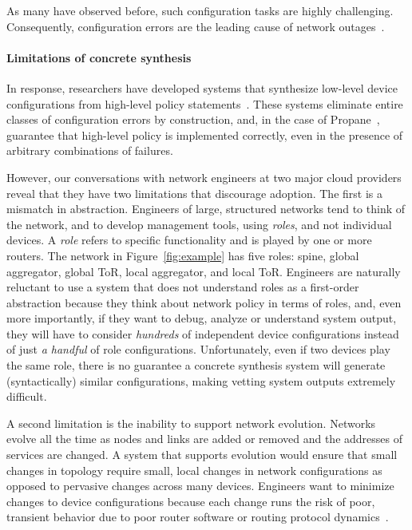 \documentclass{sig-alternate-10pt}
\begin{document}
As many have observed before, such configuration tasks are highly challenging. Consequently, configuration errors are the leading cause of network outages~\cite{juniper-study,bgpmon,batfish,propane}.

\paragraph*{Limitations of concrete synthesis}

In response, researchers have developed systems that synthesize low-level device configurations from high-level policy statements~\cite{narain:lisa05,narain+:configassure,dadc,propane}.
These systems eliminate entire classes of configuration errors by construction, and, in the case of
Propane~\cite{propane}, guarantee that high-level policy is implemented correctly, even in the presence of 
arbitrary combinations of failures.

However, our conversations with network engineers at two major cloud providers reveal that they have two limitations that discourage adoption.  The first is a mismatch in abstraction. Engineers of large, structured networks tend to think of the network, and to develop management tools, using \emph{roles}, and not individual devices. 
A {\em role} refers to specific functionality and is played by one or more routers. The network in Figure~\ref{fig:example} has five roles: spine, global aggregator, global ToR, local aggregator, and local ToR.  Engineers are naturally reluctant to use a system that does not 
understand roles as a first-order abstraction because they think about 
network policy in terms of roles, and, even more importantly, if they want to debug, analyze or 
understand system output, they will have to consider 
\emph{hundreds} of independent device configurations instead of just
\emph{a handful} of role configurations. Unfortunately, even if two devices play the same role,
there is no guarantee a concrete synthesis system will generate (syntactically) similar configurations,
making vetting system outputs extremely difficult. 

A second limitation is the inability to support network evolution. Networks evolve all the time as nodes and links are added or removed and the addresses of services are changed. A system that supports evolution would ensure that 
small changes in topology require small, local changes in network configurations as opposed to pervasive
changes across many devices.  Engineers want to minimize changes to device configurations because each change runs the risk of poor, transient behavior due to poor router software or routing protocol dynamics~\cite{ratulbgpmisconfigs}.  
\end{document}
